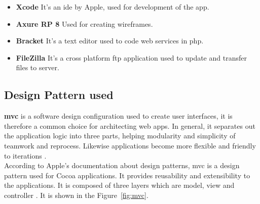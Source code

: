 \begin{itemize}
    \item \textbf{Xcode}
    It's an \gls{ide} by Apple, used for development of the app. \\
    
    \item \textbf{Axure RP 8}
    Used for creating wireframes. \\
    
    \item \textbf{Bracket}
    It's a text editor used to code web services in \gls{php}. \\
    
    \item \textbf{FileZilla}
    It's a cross platform \gls{ftp} application used to update and transfer files to server. \\
    
\end{itemize}


\subsection{Design Pattern used}


\textbf{\gls{mvc}} is a software design configuration used to create user interfaces, it is therefore a common choice for architecting web apps. In general, it separates out the application logic into three parts, helping modularity and simplicity of teamwork and reprocess. Likewise applications become more flexible and friendly to iterations \cite{MVC}. \\

According to Apple's documentation about design patterns, \gls{mvc} is a design pattern used for Cocoa applications. It provides reusability and extensibility to the applications. It is composed of three layers which are model, view and controller \cite{MVC_Apple}. It is shown in the Figure~\ref{fig:mvc}.

